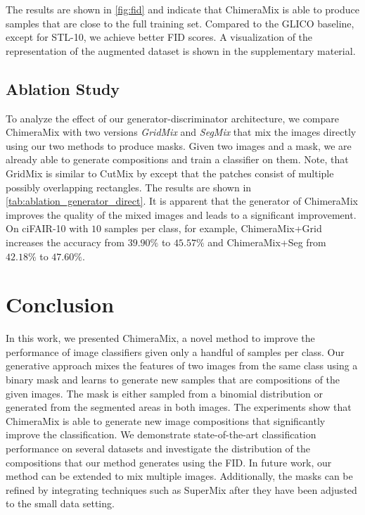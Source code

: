 \documentclass{article}
\newcommand{\methodname}{ChimeraMix\xspace}
\newcommand{\methodnamegrid}{ChimeraMix+Grid\xspace}
\newcommand{\methodnameseg}{ChimeraMix+Seg\xspace}
\newcommand{\textcite}[1]{\citeauthor{#1}\xspace\shortcite{#1}}
\newcommand{\cifairX}{ciFAIR-10\xspace}
\newcommand{\stl}{STL-10\xspace}
\begin{document}
The results are shown in \cref{fig:fid} and indicate that \methodname is able to produce samples that are close to the full training set.
Compared to the \ac{GLICO} baseline, except for \stl, we achieve better \ac{FID} scores.
A visualization of the representation of the augmented dataset is shown in the supplementary material. 


\subsection{Ablation Study}
\label{subsec:ablation_study}

To analyze the effect of our generator-discriminator architecture, we compare \methodname with two versions \emph{GridMix} and \emph{SegMix} that mix the images directly using our two methods to produce masks.
Given two images and a mask, we are already able to generate compositions and train a classifier on them.
Note, that GridMix is similar to CutMix by \textcite{yunCutMixRegularizationStrategy2019} except that the patches consist of multiple possibly overlapping rectangles.
The results are shown in \cref{tab:ablation_generator_direct}.
It is apparent that the generator of \methodname improves the quality of the mixed images and leads to a significant improvement. 
On \cifairX with $10$ samples per class, for example, \methodnamegrid increases the accuracy from $39.90\%$ to $45.57\%$ and \methodnameseg from $42.18\%$ to $47.60\%$.

\section{Conclusion}
\label{sec:conclusion}

In this work, we presented \methodname, a novel method to improve the performance of image classifiers given only a handful of samples per class.
Our generative approach mixes the features of two images from the same class using a binary mask and learns to generate new samples that are compositions of the given images.
The mask is either sampled from a binomial distribution or generated from the segmented areas in both images.
The experiments show that \methodname is able to generate new image compositions that significantly improve the classification. 
We demonstrate state-of-the-art classification performance on several datasets and investigate the distribution of the compositions that our method generates using the \acl{FID}.
In future work, our method can be extended to mix multiple images.
Additionally, the masks can be refined by integrating techniques such as SuperMix after they have been adjusted to the small data setting.
\end{document}
